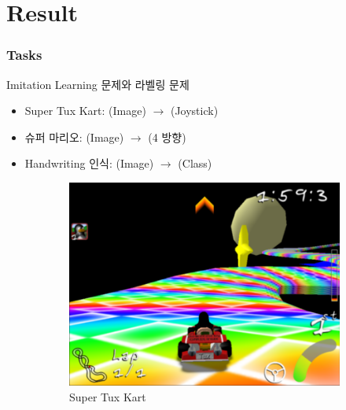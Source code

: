 \documentclass[11pt,xcolor={dvipsnames},hyperref={pdftex,pdfpagemode=UseNone,hidelinks,pdfdisplaydoctitle=true},usepdftitle=false]{beamer}
\begin{document}
\section*{Result}

\begin{frame}
\end{frame}

\begin{frame}
\frametitle{Tasks}

Imitation Learning 문제와 라벨링 문제

\vspace{5mm}

\begin{itemize}
    \item Super Tux Kart: \quad (Image) $\rightarrow$ (Joystick)
    \item 슈퍼 마리오: \quad (Image) $\rightarrow$ (4 방향)
    \item Handwriting 인식: \quad (Image) $\rightarrow$ (Class)
\end{itemize}
\begin{figure}
    \setcounter{subfigure}{0}
    \centering
    \begin{subfigure}[b]{0.3\textwidth}
        \centering
        \includegraphics[width=\textwidth]{figs/stk.png}
        \caption{Super Tux Kart}
        \label{fig:stk}
    \end{subfigure}
    \begin{subfigure}[b]{0.3\textwidth}
        \centering

\end{subfigure}
\end{figure}
\end{frame}
\end{document}
